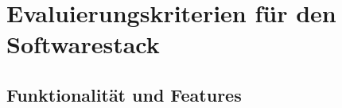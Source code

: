 \chapter{Evaluierungskriterien für den Softwarestack}\label{sec:funktionalitaet-features}
\section{Funktionalität und Features}